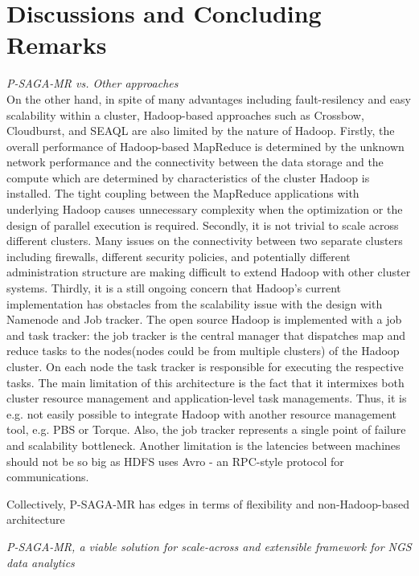 \documentclass{sig-alternate}
\begin{document}
\section{Discussions and Concluding Remarks}\label{sec:discussions}
\textit{P-SAGA-MR vs. Other approaches}
\\

On the other hand, in spite of many advantages including fault-resilency and easy scalability within a cluster, Hadoop-based approaches such as Crossbow, Cloudburst, and SEAQL are also limited by the nature of Hadoop.  Firstly, the overall performance of Hadoop-based MapReduce is determined by the unknown network performance and the connectivity between the data storage and the compute which are determined by characteristics of the cluster Hadoop is installed.  The tight coupling between the MapReduce applications with underlying Hadoop causes unnecessary complexity when the optimization or the design of parallel execution is required.  Secondly, it is not trivial to scale across different clusters.  Many issues on the connectivity between two separate clusters including firewalls, different security policies, and potentially different administration structure are making difficult to extend Hadoop with other cluster systems.  Thirdly, it is a still ongoing concern that Hadoop's current implementation has obstacles from the scalability issue with the design with Namenode and Job tracker.   The open source Hadoop is implemented with a job and task tracker: the job tracker is the central manager that dispatches map and reduce tasks to the nodes(nodes could be from multiple clusters) of the Hadoop cluster. On each node the task tracker is responsible for executing the respective tasks. The main limitation of this architecture is the fact that it intermixes both cluster resource management and application-level task managements. Thus, it is e.g. not easily possible to integrate Hadoop with another resource management tool, e.g. PBS or Torque. Also, the job tracker represents a single point of failure and scalability bottleneck. Another limitation is the latencies between machines should not be so big as HDFS uses Avro - an RPC-style protocol for communications.

Collectively, P-SAGA-MR has edges in terms of flexibility and non-Hadoop-based architecture

\textit{P-SAGA-MR, a viable solution for scale-across and extensible framework for NGS data analytics}
\\
\end{document}
